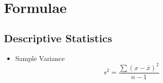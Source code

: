 \documentclass[a4paper,12pt]{article}
\begin{document}
%

\newpage





\section*{Formulae}
\subsection*{Descriptive Statistics}
\begin{itemize}
	\item Sample Variance
	\begin{equation*}
	s^2 = \frac{\sum (x-\bar{x})^2}{n-1}
	\end{equation*}
\end{itemize}
\end{document}

